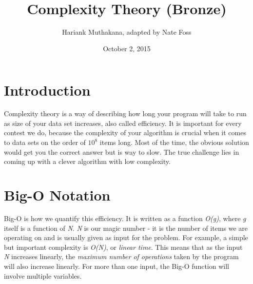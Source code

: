 \documentclass{article}
\title{Complexity Theory (Bronze)}
\author{Hariank Muthakana, adapted by Nate Foss}
\date{October 2, 2015}
\begin{document}
\maketitle

\section{Introduction}
Complexity theory is a way of describing how long your program will take to run as size of your data set increases, also called efficiency.  It is important for every contest we do, because the complexity of your algorithm is crucial when it comes to data sets on the order of $10^8$ items long.  Most of the time, the obvious solution would get you the correct answer but is way to slow. The true challenge lies in coming up with a clever algorithm with low complexity.

\section{Big-O Notation}
Big-O is how we quantify this efficiency. It is written as a function \textit{O(g)}, where \textit{g} itself is a function of \textit{N}.  \textit{N} is our magic number - it is the number of items we are operating on and is usually given as input for the problem. For example, a simple but important complexity is \textit{O(N)}, or \textit{linear time}. This means that as the input \textit{N} increases linearly, the \textit{maximum number of operations} taken by the program will also increase linearly. For more than one input, the Big-O function will involve multiple variables.
\end{document}
